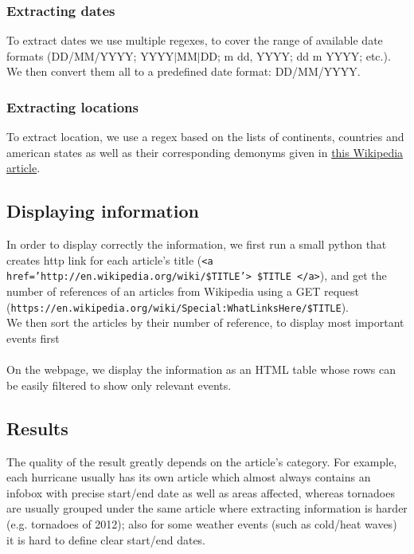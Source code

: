 \subsubsection{Extracting dates}
To extract dates we use multiple regexes, to cover the range of available date formats (DD/MM/YYYY; YYYY$|$MM$|$DD; m dd, YYYY; dd m YYYY; etc.). We then convert them all to a predefined date format: DD/MM/YYYY. 
\subsubsection{Extracting locations}
To extract location, we use a regex based on the lists of continents, countries and american states as well as their corresponding demonyms given in \href{http://en.wikipedia.org/wiki/List_of_adjectival_forms_of_place_names}{this Wikipedia article}.
\subsection{Displaying information}
In order to display correctly the information, we first run a small python that creates http link for each article's title (\texttt{<a href='http://en.wikipedia.org/wiki/\$TITLE'> \$TITLE </a>}), and get the number of references of an articles from Wikipedia using a GET request (\texttt{https://en.wikipedia.org/wiki/Special:WhatLinksHere/\$TITLE}).\\
We then sort the articles by their number of reference, to display most important events first\\\\
On the webpage, we display the information as an HTML table whose rows can be easily filtered to show only relevant events.
\subsection{Results}
The quality of the result greatly depends on the article's category. For example, each hurricane usually has its own article which almost always contains an infobox with precise start/end date as well as areas affected, whereas tornadoes are usually grouped under the same article where extracting information is harder (e.g. tornadoes of  2012); also for some weather events (such as cold/heat waves) it is hard to define clear start/end dates.
%
